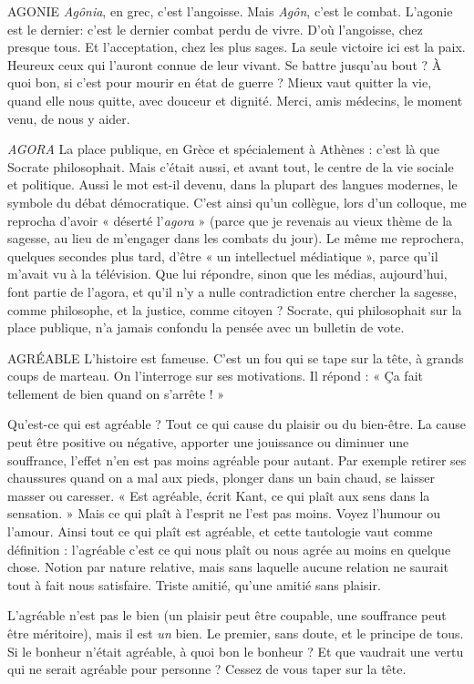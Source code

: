 AGONIE {\it Agônia}, en grec, c’est l’angoisse. Mais {\it Agôn}, c’est le combat. L’agonie
est le dernier: c’est le dernier combat perdu de vivre. D'où
l'angoisse, chez presque tous. Et l’acceptation, chez les plus sages. La seule victoire
ici est la paix. Heureux ceux qui l’auront connue de leur vivant. Se battre
jusqu’au bout ? À quoi bon, si c’est pour mourir en état de guerre ? Mieux vaut
quitter la vie, quand elle nous quitte, avec douceur et dignité. Merci, amis
médecins, le moment venu, de nous y aider.

{\it AGORA} La place publique, en Grèce et spécialement à Athènes : c’est là que
Socrate philosophait. Mais c'était aussi, et avant tout, le centre de
la vie sociale et politique. Aussi le mot est-il devenu, dans la plupart des langues
modernes, le symbole du débat démocratique. C’est ainsi qu’un collègue, lors
d’un colloque, me reprocha d’avoir « déserté l’{\it agora} » (parce que je revenais au
vieux thème de la sagesse, au lieu de m’engager dans les combats du jour). Le
même me reprochera, quelques secondes plus tard, d’être « un intellectuel
médiatique », parce qu’il m'avait vu à la télévision. Que lui répondre, sinon
que les médias, aujourd’hui, font partie de l’agora, et qu’il n’y a nulle contradiction
entre chercher la sagesse, comme philosophe, et la justice, comme
citoyen ? Socrate, qui philosophait sur la place publique, n’a jamais confondu
la pensée avec un bulletin de vote.

AGRÉABLE L'histoire est fameuse. C’est un fou qui se tape sur la tête, à grands
coups de marteau. On l’interroge sur ses motivations. Il répond :
« Ça fait tellement de bien quand on s'arrête ! »

Qu'est-ce qui est agréable ? Tout ce qui cause du plaisir ou du bien-être. La
cause peut être positive ou négative, apporter une jouissance ou diminuer une
souffrance, l'effet n’en est pas moins agréable pour autant. Par exemple retirer
ses chaussures quand on a mal aux pieds, plonger dans un bain chaud, se laisser
masser ou caresser. « Est agréable, écrit Kant, ce qui plaît aux sens dans la
sensation. » Mais ce qui plaît à l'esprit ne l’est pas moins. Voyez l'humour ou
l'amour. Ainsi tout ce qui plaît est agréable, et cette tautologie vaut comme
définition : l’agréable c’est ce qui nous plaît ou nous agrée au moins en quelque
chose. Notion par nature relative, mais sans laquelle aucune relation ne saurait
tout à fait nous satisfaire. Triste amitié, qu’une amitié sans plaisir.

L’agréable n’est pas le bien (un plaisir peut être coupable, une souffrance peut
être méritoire), mais il est {\it un} bien. Le premier, sans doute, et le principe de tous.
Si le bonheur n’était agréable, à quoi bon le bonheur ? Et que vaudrait une vertu
qui ne serait agréable pour personne ? Cessez de vous taper sur la tête.

